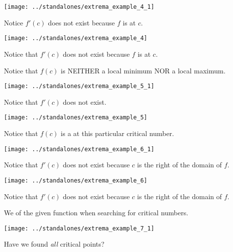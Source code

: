 \documentclass[12pt]{beamer}
\begin{document}
\begin{frame}[t]
  \texttt{[image: ../standalones/extrema\_example\_4\_1]}

  Notice \(f'(c)\) does not exist because \(f\) is  at \(c\). 
\end{frame}

\begin{frame}[t]
  \texttt{[image: ../standalones/extrema\_example\_4]}
  
  Notice that \(f'(c)\) does not exist because \(f\) is  at \(c\). 
  \pause 

  Notice that \(f(c)\) is NEITHER a local minimum NOR a local maximum.
\end{frame}


\begin{frame}[t]
  \texttt{[image: ../standalones/extrema\_example\_5\_1]}

  Notice that \(f'(c)\) does not exist.
\end{frame}

\begin{frame}[t]
  \texttt{[image: ../standalones/extrema\_example\_5]}
  
  \pause 
  Notice that \(f(c)\) is a  at this particular critical number.
\end{frame}


\begin{frame}[t]
  \texttt{[image: ../standalones/extrema\_example\_6\_1]}

  Notice that \(f'(c)\) does not exist because \(c\) is the right  of the domain of \(f\).
\end{frame}

\begin{frame}[t]
  \texttt{[image: ../standalones/extrema\_example\_6]}
  
  Notice that \(f'(c)\) does not exist because \(c\) is the right  of the domain of \(f\).

  \pause        
  \hlwarn{\faExclamationTriangle{}} We  of the given function when searching for critical numbers.
\end{frame}



\begin{frame}[t]
  \texttt{[image: ../standalones/extrema\_example\_7\_1]}
  
  \faComment{} Have we found \emph{all} critical points?
\end{frame}
\end{document}
